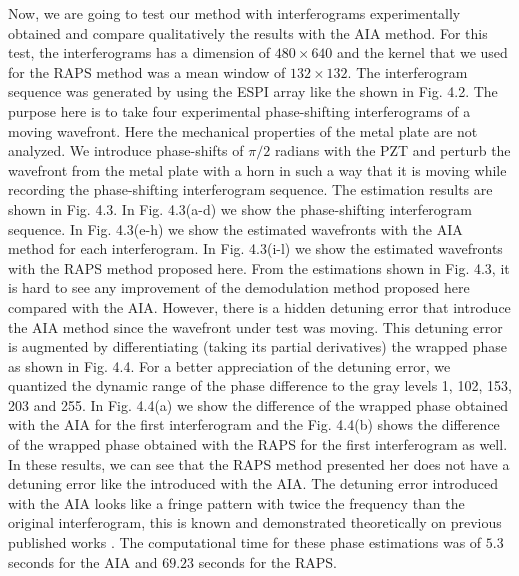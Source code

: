 Now, we are going to test our method with interferograms experimentally obtained
and compare qualitatively the results with the AIA method. For this test, the
interferograms has a dimension of $480 \times 640$ and the kernel that we used
for the RAPS method was a mean window of $132\times 132$. The interferogram
sequence was generated by using the ESPI array like the shown in Fig. 4.2. The
purpose here is to take four experimental phase-shifting interferograms of a
moving wavefront. Here the mechanical properties of the metal plate are not
analyzed. We introduce phase-shifts of $\pi/2$ radians with the PZT and perturb
the wavefront from the metal plate with a horn in such a way that it is moving
while recording the phase-shifting interferogram sequence. The estimation
results are shown in Fig. 4.3. In Fig. 4.3(a-d) we show the phase-shifting
interferogram sequence. In Fig. 4.3(e-h) we show the estimated wavefronts with
the AIA method for each interferogram. In Fig. 4.3(i-l) we show the estimated
wavefronts with the RAPS method proposed here. From the estimations shown in
Fig. 4.3, it is hard to see any improvement of the demodulation method proposed
here compared with the AIA. However, there is a hidden detuning error that
introduce the AIA method since the wavefront under test was moving. This
detuning error is augmented by differentiating (taking its partial derivatives)
the wrapped phase as shown in Fig. 4.4. For a better appreciation of the
detuning error, we quantized the dynamic range of the phase difference to the
gray levels 1, 102, 153, 203 and 255. In Fig. 4.4(a) we show the difference of
the wrapped phase obtained with the AIA for the first interferogram and the
Fig. 4.4(b) shows the difference of the wrapped phase obtained with the RAPS for
the first interferogram as well. In these results, we can see that the RAPS
method presented her does not have a detuning error like the introduced with the
AIA. The detuning error introduced with the AIA looks like a fringe pattern with
twice the frequency than the original interferogram, this is known and
demonstrated theoretically on previous published works
\cite{Schwider:83,Servin:09}. The computational time for these phase
estimations was of $5.3$ seconds for the AIA and $69.23$ seconds for the RAPS.

